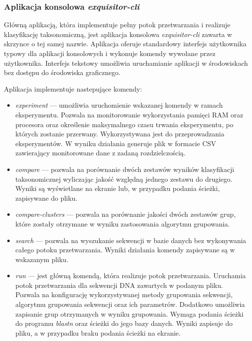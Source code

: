         \subsubsection{Aplikacja konsolowa \textit{exquisitor-cli}}
            Główną aplikacją, która implementuje pełny potok przetwarzania i realizuje klasyfikację taksonomiczną, jest aplikacja konsolowa \textit{exquisitor-cli} zawarta w skrzynce o tej samej nazwie. Aplikacja oferuje standardowy interfejs użytkownika typowy dla aplikacji konsolowych i wykonuje komendy wywołane przez użytkownika. Interfejs tekstowy umożliwia uruchamianie aplikacji w środowiskach bez dostępu do środowiska graficznego.

            Aplikacja implementuje nastepujące komendy:
            \begin{itemize}
                \item {
                    \textit{experiment} --- umożliwia uruchomienie wskazanej komendy w ramach eksperymentu. Pozwala na monitorowanie wykorzystania pamięci RAM oraz procesora oraz określenie maksymalnego czasu trwania eksperymentu, po których zostanie przerwany. Wykorzystywana jest do przeprowadzania eksperymentów. W wyniku działania generuje plik w formacie CSV zawierający monitorowane dane z zadaną rozdzielczością.
                }
                \item {
                    \textit{compare} --- pozwala na porównanie dwóch zestawów wyników klasyfikacji taksonomicznej wyliczając jakość względną jednego zestawu do drugiego. Wyniki są wyświetlane na ekranie lub, w przypadku podania ścieżki, zapisywane do pliku.
                }
                \item {
                    \textit{compare-clusters} --- pozwala na porównanie jakości dwóch zestawów grup, które zostały otrzymane w wyniku zastosowania algorytmu grupowania.
                }
                \item {
                    \textit{search} --- pozwala na wyszukanie sekwencji w bazie danych bez wykonywania całego potoku przetwarzania. Wyniki działania komendy zapisywane są w wskazanym pliku.
                }
                \item {
                    \textit{run} --- jest główną komendą, która realizuje potok przetwarzania. Uruchamia potok przetwarzania dla sekwencji DNA zawartych w podanym pliku. Pozwala na konfigurację wykorzystywanej metody grupowania sekwencji, algorytmu grupowania sekwencji oraz ich parametrów. Dodatkowo umożliwia zapisanie grup otrzymanych w wyniku grupowania. Wymaga podania ścieżki do programu \textit{blastn} oraz ścieżki do jego bazy danych. Wyniki zapisuje do pliku, a w przypadku braku podania ścieżki na ekranie.
                }
            \end{itemize}

